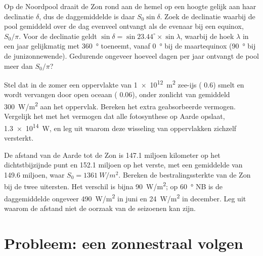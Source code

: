 \begin{exercise}[$\star\star\star$]\label{exo:g10:earth-energy-budget:13}
Op de Noordpool draait de Zon rond aan de hemel op een hoogte gelijk aan haar
declinatie $\delta$, dus de daggemiddelde  is daar $S_0 \sin
\delta$. Zoek de declinatie waarbij de pool gemiddeld over de dag evenveel
ontvangt als de evenaar bij een equinox, $S_0/\pi$. Voor de declinatie geldt
$\sin\delta = \sin 23.44^\circ \times \sin\lambda$, waarbij de hoek $\lambda$
in een jaar gelijkmatig met \qty{360}{\degree} toeneemt, vanaf
\qty{0}{\degree} bij de maartequinox (\qty{90}{\degree} bij de
junizonnewende). Gedurende ongeveer hoeveel dagen per jaar ontvangt de pool meer
dan $S_0/\pi$?
\end{exercise}

\begin{exercise}[$\star\star\star$]\label{exo:g10:earth-energy-budget:14}
Stel dat in de zomer een oppervlakte van \qty{1e12}{m^2} zee-ijs ( 0.6)
smelt en wordt vervangen door open oceaan ( 0.06), onder zonlicht van
gemiddeld \qty{300}{W/m^2} aan het oppervlak. Bereken het extra geabsorbeerde
vermogen. Vergelijk het met het vermogen dat alle fotosynthese op Aarde
opslaat, \qty{1.3e14}{W}, en leg uit waarom deze wisseling van oppervlakken
zichzelf versterkt.
\end{exercise}

\begin{exercise}[$\star\star\star$]\label{exo:g10:earth-energy-budget:15}
De afstand van de Aarde tot de Zon is \num{147.1} miljoen kilometer op het
dichtstbijzijnde punt en \num{152.1} miljoen op het verste, met een gemiddelde
van \num{149.6} miljoen, waar $S_0 = \qty{1361}{W/m^2}$. Bereken de
bestralingssterkte van de Zon bij de twee uitersten. Het verschil is bijna
\qty{90}{W/m^2}; op \qty{60}{\degree} NB is de daggemiddelde  ongeveer
\qty{490}{W/m^2} in juni en \qty{24}{W/m^2} in december. Leg uit waarom de
afstand niet de oorzaak van de seizoenen kan zijn.
\end{exercise}

\section{Probleem: een zonnestraal volgen}

